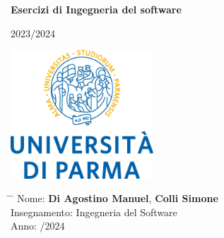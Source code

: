 \documentclass[12pt,a4paper]{article}
\title{}
\author{}
\date{}
\begin{document}
	
	\newcommand{\subf}[2]{%
		{\small\begin{tabular}[t]{@{}c@{}}
				#1\\#2
		\end{tabular}}%
	}
	
	\begin{titlepage}
		\begin{center}
			\vspace*{3cm}
			
			\Huge
			\textbf{Esercizi di Ingegneria del software}
			
			\vspace{0.3cm}
			\Huge
			2023/2024
			
			\vspace{0.8cm}
			\large
			
			
			
			\vspace{0.5cm}
			\LARGE
			
			
			\vspace{1.5cm}
			
			\textbf{}
            \includegraphics[width=0.4\textwidth]{images/unipr_logo.jpg}
			
			\vfill
			
			
			
			\vspace{0.8cm}
			
			
			
			\Large
			
			
			
			
		\end{center}
		\Large
		\begin{tabbing}
			\hspace*{1em}\= \hspace*{8em} \= \kill %
			\> Nome:\>  \textbf{Di Agostino Manuel}, \textbf{Colli Simone} \\
			\> Insegnamento:\>  Ingegneria del Software  \\
			\> Anno:  \> 2023/2024
		\end{tabbing}
		
	\end{titlepage}
\end{document}

